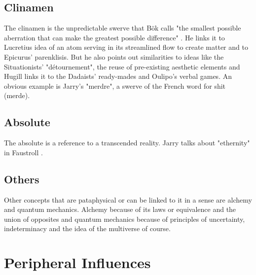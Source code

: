\subsection{Clinamen}

The clinamen is the unpredictable swerve that Bök calls "the smallest possible aberration that can make the greatest possible difference"  \citep[p.43]{Bok2002}. He links it to Lucretius idea of an atom serving in its streamlined flow to create matter and to Epicurus' parenklisis. But he also points out similarities to ideas like the Situationists' "détournement", the reuse of pre-existing aesthetic elements and Hugill links it to the Dadaists' ready-mades and Oulipo's verbal games. An obvious example is Jarry's "merdre", a swerve of the French word for shit (merde).

\subsection{Absolute}

The absolute is a reference to a transcended reality. Jarry talks about "ethernity" in Faustroll \citep[p.104]{Jarry1996}.

\subsection{Others}

Other concepts that are pataphysical or can be linked to it in a sense are alchemy and quantum mechanics. Alchemy because of its laws or equivalence and the union of opposites \citep{Hugill2012} and quantum mechanics because of principles of uncertainty, indeterminacy and the idea of the multiverse of course.

\section{Peripheral Influences}

